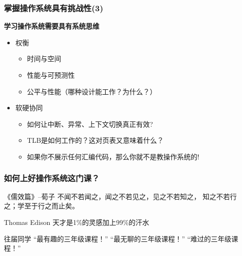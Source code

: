     
\begin{frame}
    \frametitle{掌握操作系统具有挑战性(3)}
    \textbf{学习操作系统需要具有系统思维} \pause

    \begin{itemize}
        \item 权衡
            \begin{itemize}
                \item 时间与空间
                \item 性能与可预测性
                \item 公平与性能（哪种设计能工作？为什么？）
            \end{itemize} \pause
        \item 软硬协同
            \begin{itemize}
                \item 如何让中断、异常、上下文切换真正有效? 
                \item TLB是如何工作的？这对页表又意味着什么？
                \item 如果你不展示任何汇编代码，那么你就不是教操作系统的!
            \end{itemize}
    \end{itemize}
\end{frame}

    
\begin{frame}
    \frametitle{如何上好操作系统这门课？}
\begin{block}{《儒效篇》--荀子}
不闻不若闻之，闻之不若见之，见之不若知之，
知之不若行之；学至于行之而止矣。 
\end{block} \pause     
\begin{block}{Thomas Edison }
   天才是1\%的灵感加上99\%的汗水 
\end{block} \pause
\begin{block}{往届同学}
   “最有趣的三年级课程！”  “最无聊的三年级课程！” “难过的三年级课程！”
\end{block}    

\end{frame}



